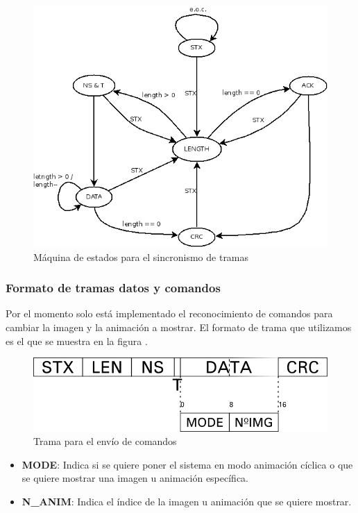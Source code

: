 \begin{figure}[!ht]
	\centering
	\includegraphics[width=\textwidth]{images/stateMachine-sinc}
	\caption{Máquina de estados para el sincronismo de tramas}
	\label{fig:stateMachine-sinc}
\end{figure}

\subsubsection{Formato de tramas datos y comandos}
Por el momento solo está implementado el reconocimiento de comandos para cambiar
la imagen y la animación a mostrar. El formato de trama que utilizamos es el que
se muestra en la figura .

\begin{figure}[!ht]
	\centering
	\includegraphics[width=\textwidth]{images/frame-data}
	\caption{Trama para el envío de comandos}
	\label{fig:frame-data}
\end{figure}

\newpage
\begin{itemize}
	\item \textbf{MODE}: Indica si se quiere poner el sistema en modo
		animación cíclica o que se quiere mostrar una imagen u animación
		específica.
	\item \textbf{N\_ANIM}: Indica el índice de la imagen u animación que se
		quiere mostrar.
\end{itemize}
